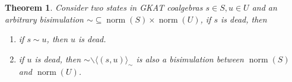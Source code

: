 \documentclass[conference]{IEEEtran}
\newtheorem{theorem}{Theorem}
\newcommand{\At}{\mathbf{At}}
\newcommand{\reject}{\mathinner{\mathrm{rej}}}
\DeclareMathOperator{\norm}{\mathrm{norm}}
\begin{document}




\begin{theorem}\label{thm:greedy-bisim-one-dead}
    Consider two states in GKAT coalgebras \(s ∈ S, u ∈ U\) and an arbitrary bisimulation \({∼} ⊆ \norm(S) × \norm(U)\), if \(s\) is dead, then 
    \begin{enumerate}
        \item\label{itm:greedy-bisim-one-dead-then-both-dead} if \(s ∼ u\), then \(u\) is dead.
        \item\label{itm:remove-dead-pairs-sound} if \(u\) is dead, then \({∼} ∖ ⟨(s, u)⟩_∼\) is also a bisimulation between \(\norm(S)\) and \(\norm(U)\).
    \end{enumerate}
\end{theorem}
\end{document}
